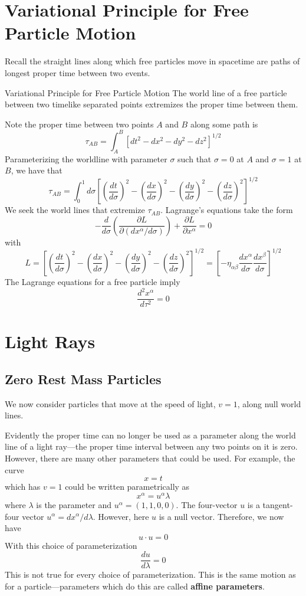 \section{Variational Principle for Free Particle Motion}
\label{sec:VarFree}


Recall the straight lines along which free particles move in spacetime are paths of longest proper time between two events. 

\begin{thm}{Variational Principle for Free Particle Motion}
    The world line of a free particle between two timelike separated points extremizes the proper time between them.
\end{thm}

Note the proper time between two points $A$ and $B$ along some path is $$\tau_{AB} = \int_{A}^B[dt^2-dx^2-dy^2-dz^2]^{1/2}$$
Parameterizing the worldline with parameter $\sigma$ such that $\sigma = 0$ at $A$ and $\sigma = 1$ at $B$, we have that $$\tau_{AB} = \int_0^1d\sigma\left[\left(\frac{dt}{d\sigma}\right)^2-\left(\frac{dx}{d\sigma}\right)^2-\left(\frac{dy}{d\sigma}\right)^2-\left(\frac{dz}{d\sigma}\right)^2\right]^{1/2}$$
We seek the world lines that extremize $\tau_{AB}$. Lagrange's equations take the form $$-\frac{d}{d\sigma}\left(\frac{\partial L}{\partial (dx^{\alpha}/d\sigma)}\right) + \frac{\partial L}{\partial x^{\alpha}} = 0$$
with $$L = \left[\left(\frac{dt}{d\sigma}\right)^2 - \left(\frac{dx}{d\sigma}\right)^2 - \left(\frac{dy}{d\sigma}\right)^2 - \left(\frac{dz}{d\sigma}\right)^2\right]^{1/2} = \left[-\eta_{\alpha\beta}\frac{dx^{\alpha}}{d\sigma}\frac{dx^{\beta}}{d\sigma}\right]^{1/2}$$
The Lagrange equations for a free particle imply $$\frac{d^2x^{\alpha}}{d\tau^2} = 0$$



\section{Light Rays}
\label{sec:lightRays}


\subsection{Zero Rest Mass Particles}

We now consider particles that move at the speed of light, $v = 1$, along null world lines.

Evidently the proper time can no longer be used as a parameter along the world line of a light ray---the proper time interval between any two points on it is zero. However, there are many other parameters that could be used. For example, the curve $$x= t$$
which has $v = 1$ could be written parametrically as $$x^{\alpha} = u^{\alpha}\lambda$$
where $\lambda$ is the parameter and $u^{\alpha} = (1,1,0,0)$. The four-vector $u$ is a tangent-four vector $u^{\alpha} = dx^{\alpha}/d\lambda$. However, here $u$ is a null vector. Therefore, we now have $$u\cdot u = 0$$
With this choice of parameterization $$\frac{du}{d\lambda} = 0$$
This is not true for every choice of parameterization. This is the same motion as for a particle---parameters which do this are called \textbf{affine parameters}.

